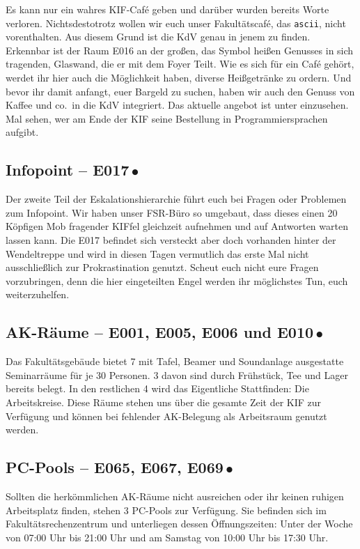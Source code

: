 Es kann nur ein wahres KIF-Café geben und darüber wurden bereits Worte verloren.
Nichtsdestotrotz wollen wir euch unser Fakultätscafé, das \texttt{ascii}, nicht vorenthalten.
Aus diesem Grund ist die KdV genau in jenem zu finden.
Erkennbar ist der Raum E016 an der großen, das Symbol heißen Genusses in sich tragenden, Glaswand, die er mit dem Foyer Teilt.
Wie es sich für ein Café gehört, werdet ihr hier auch die Möglichkeit haben, diverse Heißgetränke zu ordern.
Und bevor ihr damit anfangt, euer Bargeld zu suchen, haben wir auch den Genuss von Kaffee und co.\ in die KdV integriert.
Das aktuelle angebot ist unter  einzusehen.
Mal sehen, wer am Ende der KIF seine Bestellung in Programmiersprachen aufgibt.

\subsection*{Infopoint -- E017{\,\color{StripeInfo}$\bullet$\,}}
Der zweite Teil der Eskalationshierarchie führt euch bei Fragen oder Problemen zum Infopoint.
Wir haben unser FSR-Büro so umgebaut, dass dieses einen 20 Köpfigen Mob fragender KIFfel gleichzeit aufnehmen und auf Antworten warten lassen kann.
Die E017 befindet sich versteckt aber doch vorhanden hinter der Wendeltreppe und wird in diesen Tagen vermutlich das erste Mal nicht ausschließlich zur Prokrastination genutzt.
Scheut euch nicht eure Fragen vorzubringen, denn die hier eingeteilten Engel werden ihr möglichstes Tun, euch weiterzuhelfen.


\subsection*{AK-Räume -- E001, E005, E006 und E010{\,\color{StripeAK}$\bullet$\,}}
Das Fakultätsgebäude bietet 7 mit Tafel, Beamer und Soundanlage ausgestatte Seminarräume für je 30 Personen.
3 davon sind durch Frühstück, Tee und Lager bereits belegt.
In den restlichen 4 wird das Eigentliche Stattfinden: Die Arbeitskreise.
Diese Räume stehen uns über die gesamte Zeit der KIF zur Verfügung und können bei fehlender AK-Belegung als Arbeitsraum genutzt werden.

\subsection*{PC-Pools -- E065, E067, E069{\,\color{StripePool}$\bullet$\,}}
Sollten die herkömmlichen AK-Räume nicht ausreichen oder ihr keinen ruhigen Arbeitsplatz finden, stehen 3 PC-Pools zur Verfügung.
Sie befinden sich im Fakultätsrechenzentrum und unterliegen dessen Öffnungszeiten:
Unter der Woche von 07:00 Uhr bis 21:00 Uhr und am Samstag von 10:00 Uhr bis 17:30 Uhr.

